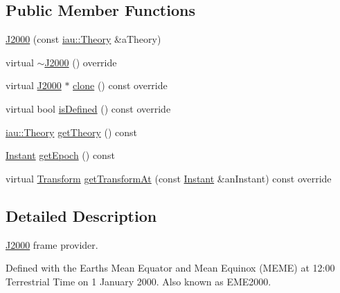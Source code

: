 \subsection*{Public Member Functions}
\begin{DoxyCompactItemize}
\item 
\hyperlink{classostk_1_1physics_1_1coord_1_1frame_1_1provider_1_1_j2000_a4cb9a4dfc78904e0b7ff96a76f7cb46a}{J2000} (const \hyperlink{namespaceostk_1_1physics_1_1coord_1_1frame_1_1providers_1_1iau_ae5e299153ae66dd034c8427dabfaff05}{iau\+::\+Theory} \&a\+Theory)
\item 
virtual \hyperlink{classostk_1_1physics_1_1coord_1_1frame_1_1provider_1_1_j2000_ab4b5931ba40d609c86980962b37f6c36}{$\sim$\+J2000} () override
\item 
virtual \hyperlink{classostk_1_1physics_1_1coord_1_1frame_1_1provider_1_1_j2000}{J2000} $\ast$ \hyperlink{classostk_1_1physics_1_1coord_1_1frame_1_1provider_1_1_j2000_ab4ec150d7b6c0e38691f3dcb4dfd74c9}{clone} () const override
\item 
virtual bool \hyperlink{classostk_1_1physics_1_1coord_1_1frame_1_1provider_1_1_j2000_ab707ff9bba9634b2ce9684ebaad342bf}{is\+Defined} () const override
\item 
\hyperlink{namespaceostk_1_1physics_1_1coord_1_1frame_1_1providers_1_1iau_ae5e299153ae66dd034c8427dabfaff05}{iau\+::\+Theory} \hyperlink{classostk_1_1physics_1_1coord_1_1frame_1_1provider_1_1_j2000_aaa4b6174cab5b7a52a4bee763be5b033}{get\+Theory} () const
\item 
\hyperlink{classostk_1_1physics_1_1time_1_1_instant}{Instant} \hyperlink{classostk_1_1physics_1_1coord_1_1frame_1_1provider_1_1_j2000_aa30348e4a396632caff0d8266f81a788}{get\+Epoch} () const
\item 
virtual \hyperlink{classostk_1_1physics_1_1coord_1_1_transform}{Transform} \hyperlink{classostk_1_1physics_1_1coord_1_1frame_1_1provider_1_1_j2000_a8e67390cf0c828e41d33ec2960d7578f}{get\+Transform\+At} (const \hyperlink{classostk_1_1physics_1_1time_1_1_instant}{Instant} \&an\+Instant) const override
\end{DoxyCompactItemize}


\subsection{Detailed Description}
\hyperlink{classostk_1_1physics_1_1coord_1_1frame_1_1provider_1_1_j2000}{J2000} frame provider. 

Defined with the Earth\textquotesingle{}s Mean Equator and Mean Equinox (M\+E\+ME) at 12\+:00 Terrestrial Time on 1 January 2000. Also known as E\+M\+E2000.

